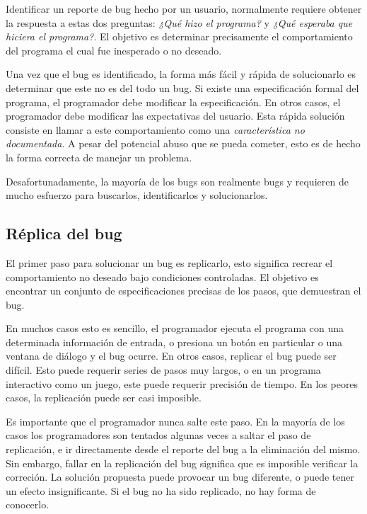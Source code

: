 \documentclass[12pt,legalpaper]{report}
\begin{document}
Identificar un reporte de bug hecho por un usuario, normalmente requiere obtener la respuesta a estas dos preguntas: \textit{¿Qué hizo el programa?} y \textit{¿Qué esperaba que hiciera el programa?}.  El objetivo es determinar precisamente el comportamiento del programa el cual fue inesperado o no deseado.

Una vez que el bug es identificado, la forma más fácil y rápida de solucionarlo es determinar que este no es del todo un bug.  Si existe una especificación formal del programa, el programador debe modificar la especificación.  En otros casos, el programador debe modificar las expectativas del usuario.  Esta rápida solución consiste en llamar a este comportamiento como una \textit{característica no documentada}.  A pesar del potencial abuso que se pueda cometer,  esto es de hecho la forma correcta de manejar un problema.

Desafortunadamente, la mayoría de los bugs son realmente bugs y requieren de mucho esfuerzo para buscarlos, identificarlos y solucionarlos.


\subsection{Réplica del bug}

El primer paso para solucionar un bug es replicarlo, esto significa recrear el comportamiento no deseado bajo condiciones controladas.  El objetivo es encontrar un conjunto de especificaciones precisas de los pasos, que demuestran el bug.

En muchos casos esto es sencillo, el programador ejecuta el programa con una determinada información de entrada, o presiona un botón en particular o una ventana de diálogo y el bug ocurre.  En otros casos, replicar el bug puede ser difícil.  Esto puede requerir series de pasos muy largos, o en un programa interactivo como un juego, este puede requerir precisión de tiempo.  En los peores casos, la replicación puede ser casi imposible.

Es importante que el programador nunca salte este paso.  En la mayoría de los casos los programadores son tentados algunas veces  a saltar el paso de replicación, e ir directamente desde el reporte del bug a la eliminación del mismo.  Sin embargo, fallar en la replicación del bug significa que es imposible verificar la correción.  La solución propuesta puede provocar un bug diferente, o puede tener un efecto insignificante.  Si el bug no ha sido replicado, no hay forma de conocerlo.
\end{document}
